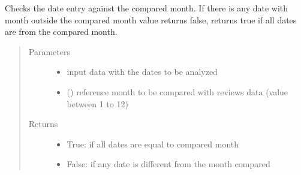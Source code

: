\documentclass[letterpaper,10pt,english]{sphinxmanual}
\begin{document}
\begin{fulllineitems}
\label{\detokenize{algorithms:algorithms.eti.eti_utils.check_entry_date}}
\sphinxAtStartPar
Checks the date entry against the compared month. If there is any date with month outside the compared month value
returns false, returns true if all dates are from the compared month.
\begin{quote}\begin{description}
\item[{Parameters}] \leavevmode\begin{itemize}
\item {} 
\sphinxAtStartPar
{} \textendash{} input data with the dates to be analyzed

\item {} 
\sphinxAtStartPar
{} () \textendash{} reference month to be compared with reviews data (value between 1 to 12)

\end{itemize}

\item[{Returns}] \leavevmode
\sphinxAtStartPar
\begin{itemize}
\item {} 
\sphinxAtStartPar
True: if all dates are equal to compared month

\item {} 
\sphinxAtStartPar
False: if any date is different from the month compared

\end{itemize}


\end{description}\end{quote}

\end{fulllineitems}

\end{document}
